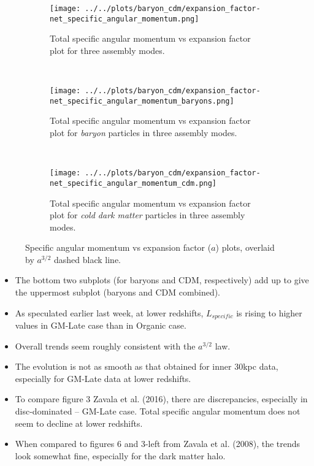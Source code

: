 \documentclass{article}
\begin{document}
	\begin{figure} [h!]
		\centering
		\begin{subfigure} {\columnwidth}
				\centering 
				\texttt{[image: ../../plots/baryon\_cdm/expansion\_factor-net\_specific\_angular\_momentum.png]}
				\caption{Total specific angular momentum vs expansion factor plot for three assembly modes.}
		\end{subfigure} \\
			\vspace{1cm}
		\begin{subfigure} {\columnwidth}
				\centering 
				\texttt{[image: ../../plots/baryon\_cdm/expansion\_factor-net\_specific\_angular\_momentum\_baryons.png]}
				\caption{Total specific angular momentum vs expansion factor plot for \emph{baryon }particles in three assembly modes.}
		\end{subfigure} \\
			\vspace{1cm}
		\begin{subfigure} {\columnwidth}
				\centering 
				\texttt{[image: ../../plots/baryon\_cdm/expansion\_factor-net\_specific\_angular\_momentum\_cdm.png]}
				\caption{Total specific angular momentum vs expansion factor plot for \emph{cold dark matter} particles in three assembly modes.}
		\end{subfigure}
		\caption{Specific angular momentum vs expansion factor (\(a\)) plots, overlaid by \(a^{3/2}\) dashed black line.}
	\end{figure} 

	\Large 
	\begin{itemize}
		\item The bottom two subplots (for baryons and CDM, respectively) add up to give the uppermost subplot (baryons and CDM combined).
		\item As speculated earlier last week, at lower redshifts, \(L_{specific}\) is rising to higher values in GM-Late case than in Organic case.
		\item Overall trends seem roughly consistent with the \(a^{3/2}\) law.
		\item The evolution is not as smooth as that obtained for inner 30kpc data, especially for GM-Late data at lower redshifts.
		\item To compare figure 3 Zavala et al. (2016), there are discrepancies, especially in disc-dominated -- GM-Late case. Total specific angular momentum does not seem to decline at lower redshifts.
		\item When compared to figures 6 and 3-left from Zavala et al. (2008), the trends look somewhat fine, especially for the dark matter halo.  
	\end{itemize} 
\end{document}
